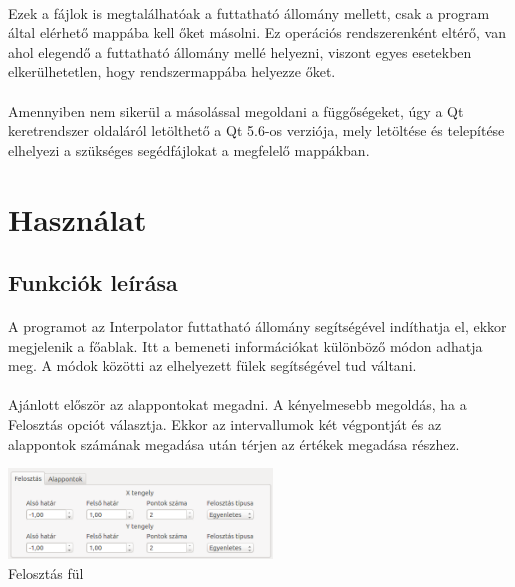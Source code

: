 \documentclass[12pt]{report}
\begin{document}
\paragraph{}
Ezek a fájlok is megtalálhatóak a futtatható állomány mellett, csak a program által elérhető mappába kell őket másolni. Ez operációs rendszerenként eltérő, van ahol elegendő a futtatható állomány mellé helyezni, viszont egyes esetekben elkerülhetetlen, hogy rendszermappába helyezze őket.
\paragraph{}
Amennyiben nem sikerül a másolással megoldani a függőségeket, úgy a Qt keretrendszer oldaláról letölthető a Qt 5.6-os verziója, mely letöltése és telepítése elhelyezi a szükséges segédfájlokat a megfelelő mappákban.

\section{Használat}

\subsection{Funkciók leírása}
\paragraph{}
A programot az Interpolator futtatható állomány segítségével indíthatja el, ekkor megjelenik a főablak.
Itt a bemeneti információkat különböző módon adhatja meg. A módok közötti az elhelyezett fülek segítségével tud váltani.
\paragraph{}
Ajánlott először az alappontokat megadni. A kényelmesebb megoldás, ha a Felosztás opciót választja. Ekkor az intervallumok két végpontját és az alappontok számának megadása után térjen az értékek megadása részhez.
\begin{center}
\includegraphics[width=7cm]{pics/gui/partition1}  \\
{\footnotesize Felosztás fül} 
\end{center}
\end{document}
